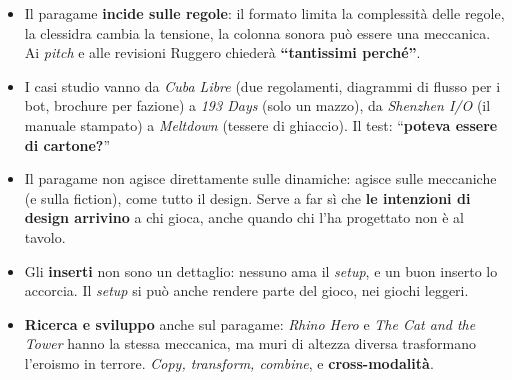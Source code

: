 \begin{itemize}
        \textbf{spazio urbano e ibridi digitali}, \textbf{inserti e setup}.
  \item Il paragame \textbf{incide sulle regole}: il formato limita la complessità
        delle regole, la clessidra cambia la tensione, la colonna sonora può essere una
        meccanica. Ai \emph{pitch} e alle revisioni Ruggero chiederà
        \textbf{``tantissimi perché''}.
  \item I casi studio vanno da \emph{Cuba Libre} (due regolamenti, diagrammi di flusso
        per i bot, brochure per fazione) a \emph{193 Days} (solo un mazzo), da
        \emph{Shenzhen I/O} (il manuale stampato) a \emph{Meltdown} (tessere di
        ghiaccio). Il test: ``\textbf{poteva essere di cartone?}''
  \item Il paragame non agisce direttamente sulle dinamiche: agisce sulle meccaniche
        (e sulla fiction), come tutto il design. Serve a far sì che \textbf{le intenzioni
        di design arrivino} a chi gioca, anche quando chi l'ha progettato non è al
        tavolo.
  \item Gli \textbf{inserti} non sono un dettaglio: nessuno ama il \emph{setup}, e un
        buon inserto lo accorcia. Il \emph{setup} si può anche rendere parte del gioco,
        nei giochi leggeri.
  \item \textbf{Ricerca e sviluppo} anche sul paragame: \emph{Rhino Hero} e \emph{The
        Cat and the Tower} hanno la stessa meccanica, ma muri di altezza diversa
        trasformano l'eroismo in terrore. \emph{Copy, transform, combine}, e
        \textbf{cross-modalità}.
\end{itemize}
